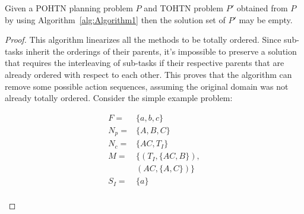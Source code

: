 \documentclass[runningheads]{llncs}
\begin{document}
 
\begin{theorem}\label{thm:notCompleteness}
	Given a POHTN planning problem $P$ and TOHTN problem
	$P'$ obtained from $P$ by using Algorithm~\ref{alg:Algorithm1}
	then the solution set of $P'$ may be empty.
\end{theorem}
\begin{proof}
	This algorithm linearizes all the methods to be totally ordered. Since sub-tasks inherit the orderings of their parents, it's impossible to preserve a solution that requires the interleaving of sub-tasks if their respective parents that are already ordered with respect to each other. This proves that the algorithm can remove some possible action sequences, assuming the original domain was not already totally ordered. Consider the simple example problem:
	
	\begin{figure}
		\caption{Diagram showing an example problem and its decomposition.}		
		\begin{subfigure}{3.5cm}
			\begin{align*}
				F   = & \{a, b, c \}           \\
				N_p =  & \{A, B, C\}      \\
				N_c = & \{AC, T_I\}            \\ 
				M   = & \{  (T_I, \{AC, B\}), \\
				       &    (AC, \{A, C\})  \} \\
				 S_I = & \{ a \} 	             \\ 
			\end{align*} 
		\end{subfigure}		
\end{figure}
\end{proof}
\end{document}

